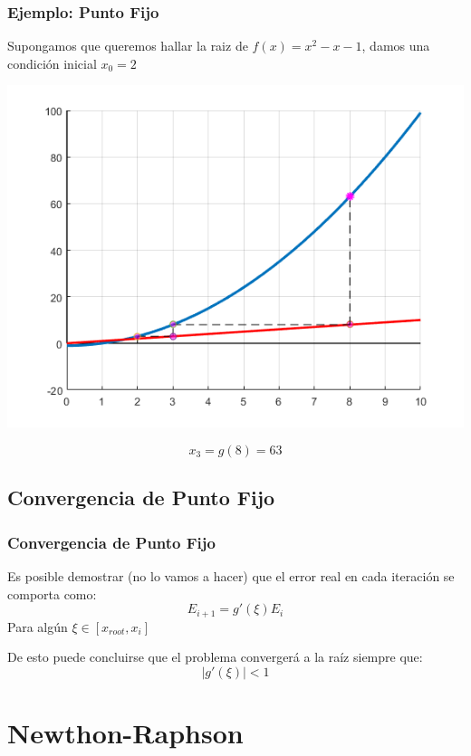 \documentclass[xcolor=svgnames]{beamer} %
\theoremstyle{plain}
\theoremstyle{definition}
\begin{document}
\begin{frame}
\frametitle{Ejemplo: Punto Fijo}

Supongamos que queremos hallar la raiz de $f(x) = x^2-x-1$,
damos una condición inicial $x_0=2$


\begin{minipage}{.75\linewidth}
\includegraphics[width=\linewidth]{fp_example2/iter3.png} 

\end{minipage}  \begin{minipage}{.2\linewidth}
$$ x_3 = g(8) = 63$$

\end{minipage}
\end{frame}

\subsection{Convergencia de Punto Fijo}


\begin{frame}
\frametitle{Convergencia de Punto Fijo}

Es posible demostrar (no lo vamos a hacer) que el error real en cada iteración se comporta como:
$$ E_{i+1} = g'(\xi) E_{i}  $$
Para algún $\xi \in [x_{root}, x_i]$ 


De esto puede concluirse que el problema convergerá a la raíz siempre que:
$$\boxed{ |g'(\xi)|<1 } $$
\end{frame}


\section{Newthon-Raphson}
\end{document}
